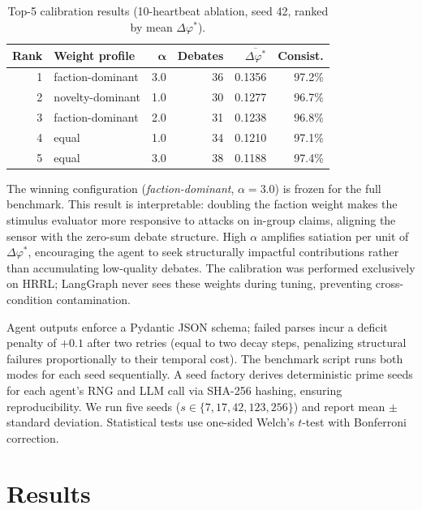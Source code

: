 \documentclass{llncs}
\begin{document}
\begin{table}
\caption{Top-5 calibration results (10-heartbeat ablation, seed 42,
ranked by mean $\Delta\varphi^*$).}\label{tab:calibration}
\small
\begin{tabular}{|r|l|r|r|r|r|}
\hline
\textbf{Rank} & \textbf{Weight profile} & $\boldsymbol{\alpha}$ &
  \textbf{Debates} & $\overline{\Delta\varphi^*}$ &
  \textbf{Consist.} \\
\hline
1 & faction-dominant & 3.0 & 36 & 0.1356 & 97.2\% \\
2 & novelty-dominant & 1.0 & 30 & 0.1277 & 96.7\% \\
3 & faction-dominant & 2.0 & 31 & 0.1238 & 96.8\% \\
4 & equal            & 1.0 & 34 & 0.1210 & 97.1\% \\
5 & equal            & 3.0 & 38 & 0.1188 & 97.4\% \\
\hline
\end{tabular}
\end{table}

The winning configuration (\emph{faction-dominant}, $\alpha{=}3.0$) is frozen
for the full benchmark.  This result is interpretable: doubling the faction
weight makes the stimulus evaluator more responsive to attacks on in-group
claims, aligning the sensor with the zero-sum debate structure.  High
$\alpha$ amplifies satiation per unit of $\Delta\varphi^*$, encouraging the
agent to seek structurally impactful contributions rather than accumulating
low-quality debates.  The calibration was performed exclusively on HRRL;
LangGraph never sees these weights during tuning, preventing cross-condition
contamination.

Agent outputs enforce a Pydantic JSON schema; failed parses incur a
deficit penalty of $+0.1$ after two retries (equal to two decay steps,
penalizing structural failures proportionally to their temporal cost).
The benchmark script runs both modes for each seed sequentially.  A seed
factory derives deterministic prime seeds for each agent's RNG and LLM call
via SHA-256 hashing, ensuring reproducibility.  We run five seeds
($s \in \{7, 17, 42, 123, 256\}$) and report mean $\pm$ standard deviation.
Statistical tests use one-sided Welch's $t$-test with Bonferroni correction.

\section{Results}
\label{sec:results}
\end{document}
